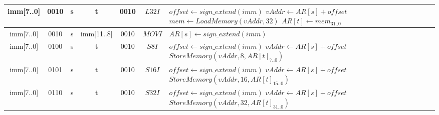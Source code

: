 \begin{longtable}{llllllllllllllllllllllll  p{1cm}  p{7cm} | }
	   \multicolumn{8}{|c|}{imm[7..0]} & \multicolumn{4}{c|}{0010} & \multicolumn{4}{c|}{s} & \multicolumn{4}{c|}{t} & \multicolumn{4}{c|}{0010} & \multicolumn{1}{c|}{$L32I$} & $offset \leftarrow sign\_extend(imm)$ \newline $vAddr \leftarrow AR[s] + offset$ \newline $mem \leftarrow LoadMemory(vAddr, 32)$ \newline $AR[t] \leftarrow mem_{31..0}$\\ \hline
	   \multicolumn{8}{|c|}{imm[7..0]} & \multicolumn{4}{c|}{0010} & \multicolumn{4}{c|}{s} & \multicolumn{4}{c|}{imm[11..8]} & \multicolumn{4}{c|}{0010} & \multicolumn{1}{c|}{$MOVI$} & $AR[s] \leftarrow sign\_extend(imm)$ \\ \hline
       \multicolumn{8}{|c|}{imm[7..0]} & \multicolumn{4}{c|}{0100} & \multicolumn{4}{c|}{s} & \multicolumn{4}{c|}{t} & \multicolumn{4}{c|}{0010} & \multicolumn{1}{c|}{$S8I$} & $offset \leftarrow sign\_extend(imm)$ \newline $vAddr \leftarrow AR[s] + offset$ \newline $StoreMemory(vAddr, 8, AR[t]_{7..0})$\\ \hline
       \multicolumn{8}{|c|}{imm[7..0]} & \multicolumn{4}{c|}{0101} & \multicolumn{4}{c|}{s} & \multicolumn{4}{c|}{t} & \multicolumn{4}{c|}{0010} & \multicolumn{1}{c|}{$S16I$} & $offset \leftarrow sign\_extend(imm)$ \newline $vAddr \leftarrow AR[s] + offset$ \newline $StoreMemory(vAddr, 16, AR[t]_{15..0})$\\ \hline
       \multicolumn{8}{|c|}{imm[7..0]} & \multicolumn{4}{c|}{0110} & \multicolumn{4}{c|}{s} & \multicolumn{4}{c|}{t} & \multicolumn{4}{c|}{0010} & \multicolumn{1}{c|}{$S32I$} & $offset \leftarrow sign\_extend(imm)$ \newline $vAddr \leftarrow AR[s] + offset$ \newline $StoreMemory(vAddr, 32, AR[t]_{31..0})$\\ \hline
	\end{longtable}

